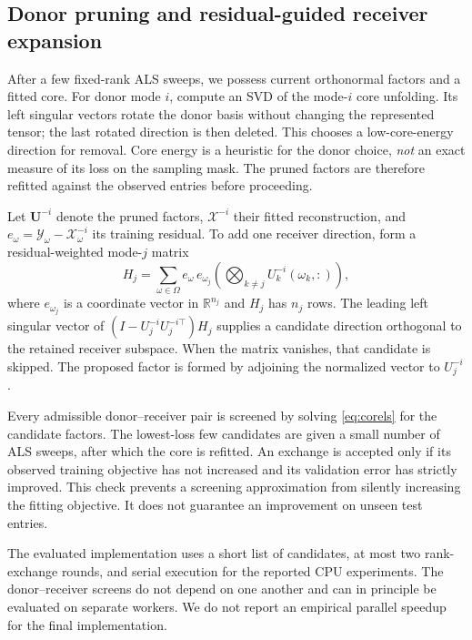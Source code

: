 \documentclass[review,10pt]{elsarticle}
\newcommand{\cX}{\mathcal X}
\newcommand{\cY}{\mathcal Y}
\newcommand{\Om}{\Omega}
\newcommand{\R}{\mathbb R}
\begin{document}
\subsection{Donor pruning and residual-guided receiver expansion}\label{subsec:construct}
After a few fixed-rank ALS sweeps, we possess current orthonormal factors and a fitted core. For donor mode $i$, compute an SVD of the mode-$i$ core unfolding. Its left singular vectors rotate the donor basis without changing the represented tensor; the last rotated direction is then deleted. This chooses a low-core-energy direction for removal. Core energy is a heuristic for the donor choice, \emph{not} an exact measure of its loss on the sampling mask. The pruned factors are therefore refitted against the observed entries before proceeding.

Let $\boldsymbol U^{-i}$ denote the pruned factors, $\cX^{-i}$ their fitted reconstruction, and $e_\omega=\cY_\omega-\cX^{-i}_\omega$ its training residual. To add one receiver direction, form a residual-weighted mode-$j$ matrix
\begin{equation}\label{eq:receiver}
H_j=\sum_{\omega\in\Om} e_\omega\, e_{\omega_j}
\left(\bigotimes_{k\neq j} U_k^{-i}(\omega_k,:)\right),
\end{equation}
where $e_{\omega_j}$ is a coordinate vector in $\R^{n_j}$ and $H_j$ has $n_j$ rows. The leading left singular vector of $(I-U_j^{-i}U_j^{-i\top})H_j$ supplies a candidate direction orthogonal to the retained receiver subspace. When the matrix vanishes, that candidate is skipped. The proposed factor is formed by adjoining the normalized vector to $U_j^{-i}$.

Every admissible donor--receiver pair is screened by solving \eqref{eq:corels} for the candidate factors. The lowest-loss few candidates are given a small number of ALS sweeps, after which the core is refitted. An exchange is accepted only if its observed training objective has not increased and its validation error has strictly improved. This check prevents a screening approximation from silently increasing the fitting objective. It does not guarantee an improvement on unseen test entries.

The evaluated implementation uses a short list of candidates, at most two rank-exchange rounds, and serial execution for the reported CPU experiments. The donor--receiver screens do not depend on one another and can in principle be evaluated on separate workers. We do not report an empirical parallel speedup for the final implementation.
\end{document}
